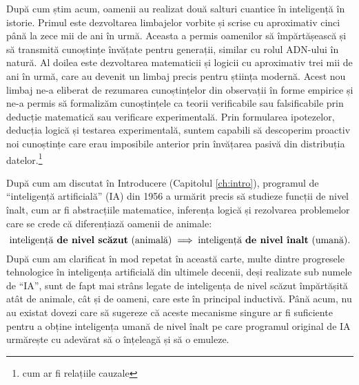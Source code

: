 \documentclass[../../book-main_ro.tex]{subfiles}
\begin{document}
După cum știm acum, oamenii au realizat două salturi cuantice în inteligență în istorie.
Primul este dezvoltarea limbajelor vorbite și scrise cu aproximativ cinci până la zece mii de ani în urmă. Aceasta a permis oamenilor să împărtășească și să transmită cunoștințe învățate pentru generații, similar cu rolul ADN-ului în natură. Al doilea este dezvoltarea matematicii și logicii cu aproximativ trei mii de ani în urmă, care au devenit un limbaj precis pentru știința modernă. Acest nou limbaj ne-a eliberat de rezumarea cunoștințelor din observații în forme empirice și ne-a permis să formalizăm cunoștințele ca teorii verificabile sau falsificabile prin deducție matematică sau verificare experimentală. Prin formularea ipotezelor, deducția logică și testarea experimentală, suntem capabili să descoperim proactiv noi cunoștințe care erau imposibile anterior prin învățarea pasivă din distribuția datelor.\footnote{cum ar fi relațiile cauzale}

După cum am discutat în Introducere (Capitolul \ref{ch:intro}), programul de ``inteligență artificială'' (IA) din 1956 a urmărit precis să studieze funcții de nivel înalt, cum ar fi abstracțiile matematice, inferența logică și rezolvarea problemelor care se crede că diferențiază oamenii de animale:
\begin{equation}
   \mbox{inteligență \textbf{de nivel scăzut} (animală)} \; \Longrightarrow \; 
   \mbox{inteligență \textbf{de nivel înalt} (umană).}
\end{equation}
După cum am clarificat în mod repetat în această carte, multe dintre progresele tehnologice în inteligența artificială din ultimele decenii, deși realizate sub numele de ``IA'', sunt de fapt mai strâns legate de inteligența de nivel scăzut împărtășită atât de animale, cât și de oameni, care este în principal inductivă. Până acum, nu au existat dovezi care să sugereze că aceste mecanisme singure ar fi suficiente pentru a obține inteligența umană de nivel înalt pe care programul original de IA urmărește cu adevărat să o înțeleagă și să o emuleze.
\end{document}
